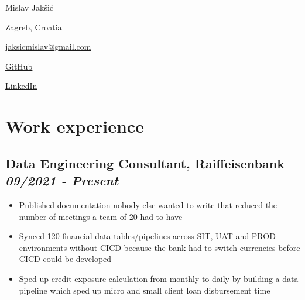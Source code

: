\documentclass[a4paper]{article}
\newcommand{\bolditalicpair}
[2]
{\textbf{#1} \texorpdfstring{\hfill}{} \textit{#2}}
\begin{document}
\pagecolor{BackgroundColor}

\begin{multicols}{3}

\noindent
\begin{minipage}{.22\textwidth}
\raggedright

{\huge Mislav Jakšić}

Zagreb, Croatia
\end{minipage}

\noindent
\begin{minipage}{.50\textwidth}
\raggedleft

\end{minipage}

\noindent
\begin{minipage}{.32\textwidth}
\raggedleft

\href{mailto:jaksicmislav@gmail.com}{jaksicmislav@gmail.com}

\href{https://github.com/MislavJaksic}{GitHub}

\href{https://www.linkedin.com/in/mislav-jaksic}{LinkedIn}

\end{minipage}

\end{multicols}



\section{Work experience}

\subsection{\bolditalicpair{Data Engineering Consultant, Raiffeisenbank}{09/2021 - Present}}

\begin{itemize}
 \item Published documentation nobody else wanted to write that reduced the number of meetings a team of 20 had to have
 \item Synced 120 financial data tables/pipelines across SIT, UAT and PROD environments without CICD because the bank had to switch currencies before CICD could be developed
 \item Sped up credit exposure calculation from monthly to daily by building a data pipeline which sped up micro and small client loan disbursement time
\end{itemize}
\end{document}
